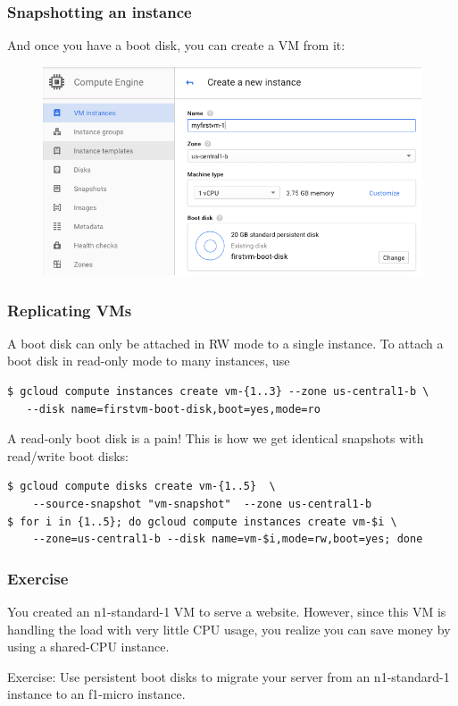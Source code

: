 \documentclass[9pt]{beamer}
\begin{document}
\begin{frame}[fragile]
  \frametitle{Snapshotting an instance}
  And once you have a boot disk, you can create a VM from it:
  \begin{figure}
    \includegraphics[scale=0.3]{figures/VMFromBootDisk.png}
  \end{figure}
\end{frame}

\begin{frame}[fragile]
  \frametitle{Replicating VMs}
  A boot disk can only be attached in RW mode to a single instance. To attach a boot disk in read-only mode to many instances, use
  \begin{verbatim}
$ gcloud compute instances create vm-{1..3} --zone us-central1-b \
   --disk name=firstvm-boot-disk,boot=yes,mode=ro
  \end{verbatim}
A read-only boot disk is a pain! This is how we get identical snapshots with read/write boot disks:
\begin{verbatim}
$ gcloud compute disks create vm-{1..5}  \
    --source-snapshot "vm-snapshot"  --zone us-central1-b
$ for i in {1..5}; do gcloud compute instances create vm-$i \
    --zone=us-central1-b --disk name=vm-$i,mode=rw,boot=yes; done
\end{verbatim}
\end{frame}

\begin{frame}[fragile]
\frametitle{Exercise}
You created an n1-standard-1 VM to serve a website. However, since this VM is handling the load with very little CPU usage, you realize you can save money by using a shared-CPU instance.

Exercise: Use persistent boot disks to migrate your server from an n1-standard-1 instance to an f1-micro instance.
\end{frame}
\end{document}
